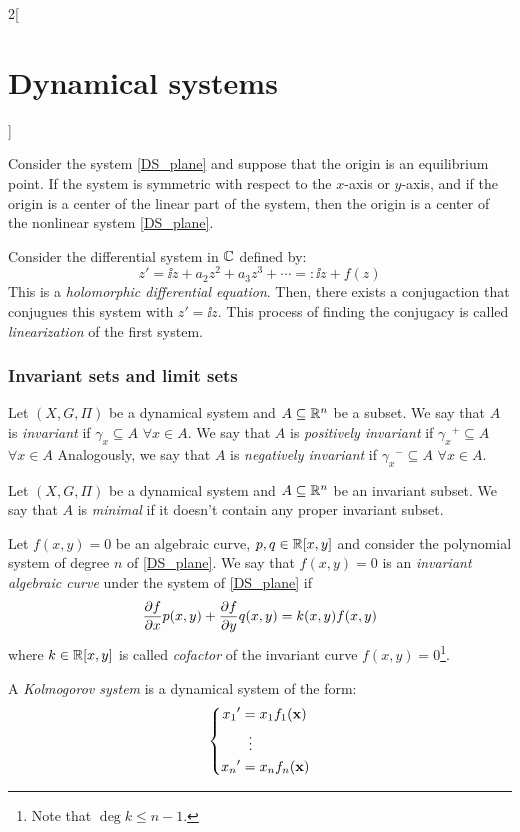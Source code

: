 \documentclass[../../../main_math.tex]{subfiles}
\begin{document}
\begin{multicols}{2}[\section{Dynamical systems}]
  \begin{theorem}
    Consider the system \cref{DS_plane} and suppose that the origin is an equilibrium point. If the system is symmetric with respect to the $x$-axis or $y$-axis, and if the origin is a center of the linear part of the system, then the origin is a center of the nonlinear system \cref{DS_plane}.
  \end{theorem}
  \begin{theorem}
    Consider the differential system in $\mathbb{C}$ defined by:
    $$z'=\ii z+ a_2z^2+a_3z^3+\cdots=:\ii z+f(z)$$ This is a \emph{holomorphic differential equation}. Then, there exists a conjugaction that conjugues this system with $z'=\ii z$. This process of finding the conjugacy is called \emph{linearization} of the first system.
  \end{theorem}
  \subsubsection{Invariant sets and limit sets}
  \begin{definition}
    Let $(X,G,\Pi)$ be a dynamical system and $A\subseteq \mathbb{R}^n$ be a subset. We say that $A$ is \emph{invariant} if $\gamma_x\subseteq A$ $\forall x\in A$. We say that $A$ is \emph{positively invariant} if ${\gamma_x}^+\subseteq A$ $\forall x\in A$ Analogously, we say that $A$ is \emph{negatively invariant} if ${\gamma_x}^-\subseteq A$ $\forall x\in A$.
  \end{definition}
  \begin{definition}
    Let $(X,G,\Pi)$ be a dynamical system and $A\subseteq \mathbb{R}^n$ be an invariant subset. We say that $A$ is \emph{minimal} if it doesn't contain any proper invariant subset.
  \end{definition}
  \begin{definition}
    Let $f(x,y)=0$ be an algebraic curve, $p,q\in\mathbb{R}[x,y]$ and consider the polynomial system of degree $n$ of \cref{DS_plane}. We say that $f(x,y)=0$ is an \emph{invariant algebraic curve} under the system of \cref{DS_plane} if
    \begin{equation}
      \pdv{f}{x}(x,y)p(x,y)+\pdv{f}{y}q(x,y)=k(x,y)f(x,y)
    \end{equation}
    where $k\in\mathbb{R}[x,y]$ is called \emph{cofactor} of the invariant curve $f(x,y)=0$\footnote{Note that $\deg k\leq n-1$.}.
  \end{definition}
  \begin{definition}
    A \emph{Kolmogorov system} is a dynamical system of the form:
    \begin{equation}
      \left\{
      \begin{aligned}
        {x_1}' & =x_1 f_1(\boldsymbol{\mathrm{x}}) \\
               & \;\;\vdots       \\
        {x_n}' & =x_n f_n(\boldsymbol{\mathrm{x}})
      \end{aligned}
      \right.
    \end{equation}
  \end{definition}

\end{multicols}
\end{document}
